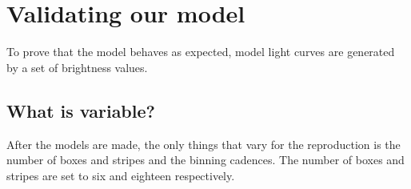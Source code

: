 









\section{Validating our model \label{validation}}
To prove that the model behaves as expected, model light curves are generated by a set of brightness values.
\subsection{What is variable? \label{variable}}
After the models are made, the only things that vary for the reproduction is the number of boxes and stripes and the binning cadences. The number of boxes and stripes are set to six and eighteen respectively.  %


